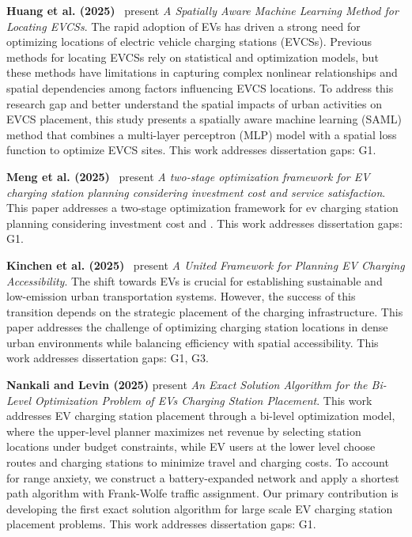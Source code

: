 \documentclass[letterpaper, 12pt, oneside, doublespacing]{Thesis}
\begin{document}
\noindent \textbf{Huang et al. (2025)}~\cite{a_spatially_2025} present \textit{A Spatially Aware Machine Learning Method for Locating EVCSs}. The rapid adoption of EVs has driven a strong need for optimizing locations of electric vehicle charging stations (EVCSs). Previous methods for locating EVCSs rely on statistical and optimization models, but these methods have limitations in capturing complex nonlinear relationships and spatial dependencies among factors influencing EVCS locations. To address this research gap and better understand the spatial impacts of urban activities on EVCS placement, this study presents a spatially aware machine learning (SAML) method that combines a multi-layer perceptron (MLP) model with a spatial loss function to optimize EVCS sites. This work addresses dissertation gaps: G1.



\noindent \textbf{Meng et al. (2025)}~\cite{a_two-stage_2025} present \textit{A two-stage optimization framework for EV charging station planning considering investment cost and service satisfaction}. This paper addresses a two-stage optimization framework for ev charging station planning considering investment cost and . This work addresses dissertation gaps: G1.



\noindent \textbf{Kinchen et al. (2025)}~\cite{a_united_2025} present \textit{A United Framework for Planning EV Charging Accessibility}. The shift towards EVs is crucial for establishing sustainable and low-emission urban transportation systems. However, the success of this transition depends on the strategic placement of the charging infrastructure. This paper addresses the challenge of optimizing charging station locations in dense urban environments while balancing efficiency with spatial accessibility. This work addresses dissertation gaps: G1, G3.



\noindent \textbf{Nankali and Levin (2025)} present \textit{An Exact Solution Algorithm for the Bi-Level Optimization Problem of EVs Charging Station Placement}. This work addresses EV charging station placement through a bi-level optimization model, where the upper-level planner maximizes net revenue by selecting station locations under budget constraints, while EV users at the lower level choose routes and charging stations to minimize travel and charging costs. To account for range anxiety, we construct a battery-expanded network and apply a shortest path algorithm with Frank-Wolfe traffic assignment. Our primary contribution is developing the first exact solution algorithm for large scale EV charging station placement problems. This work addresses dissertation gaps: G1.
\end{document}
